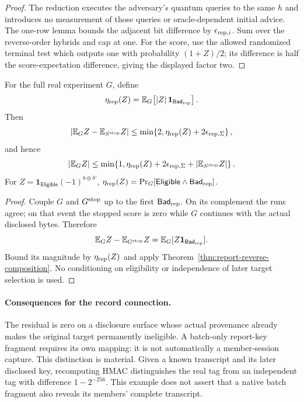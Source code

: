 \begin{proof}
The reduction executes the adversary's quantum queries to the same $h$ and
introduces no measurement of those queries or oracle-dependent initial advice.
The one-row lemma bounds the adjacent bit difference by
$\epsilon_{{\rm rep},i}$.  Sum over the reverse-order hybrids and cap at one.
For the score, use the allowed randomized terminal test which outputs one
with probability $(1+Z)/2$; its difference is half the score-expectation
difference, giving the displayed factor two.
\end{proof}

\begin{corollary}
\label{cor:report-exposure-residual}
For the full real experiment $G$, define
\[
 \eta_{\rm rep}(Z)
 =\mathbb E_G\!\left[|Z|\,
                    \mathbf1_{\mathsf{Bad}_{\rm rep}}\right].
\]
Then
\[
 \left|\mathbb E_GZ-\mathbb E_{S^{\rm stop}}Z\right|
 \le\min\!\left\{2,\eta_{\rm rep}(Z)
                       +2\epsilon_{{\rm rep},\Sigma}\right\},
\]
and hence
\[
 |\mathbb E_GZ|
 \le\min\!\left\{1,\eta_{\rm rep}(Z)
       +2\epsilon_{{\rm rep},\Sigma}
       +|\mathbb E_{S^{\rm stop}}Z|\right\}.
\]
For $Z=\mathbf1_{\mathsf{Eligible}}(-1)^{b\oplus b'}$,
$\eta_{\rm rep}(Z)=
\Pr_G[\mathsf{Eligible}\land\mathsf{Bad}_{\rm rep}]$.
\end{corollary}

\begin{proof}
Couple $G$ and $G^{\rm stop}$ up to the first
$\mathsf{Bad}_{\rm rep}$.  On its complement the runs agree; on that event the
stopped score is zero while $G$ continues with the actual disclosed bytes.
Therefore
\[
 \mathbb E_GZ-\mathbb E_{G^{\rm stop}}Z
   =\mathbb E_G[Z\mathbf1_{\mathsf{Bad}_{\rm rep}}].
\]
Bound its magnitude by $\eta_{\rm rep}(Z)$ and apply
Theorem~\ref{thm:report-reverse-composition}.  No conditioning on eligibility
or independence of later target selection is used.
\end{proof}

\paragraph{Consequences for the record connection.}
The residual is zero on a disclosure surface whose actual provenance already
makes the original target permanently ineligible.  A batch-only report-key
fragment requires its own mapping: it is not automatically a member-session
capture.  This distinction is material.  Given a known transcript and its
later disclosed key, recomputing HMAC distinguishes the real tag from an
independent tag with difference $1-2^{-256}$.  This example does not assert
that a native batch fragment also reveals its members' complete transcript.

